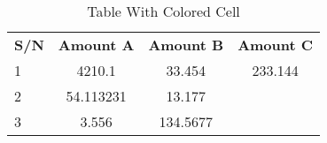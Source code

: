 \documentclass{article}
\begin{document}
	\begin{table}[h!]
		\begin{center}
			\caption{Table With Colored Cell}
			\label{tab:table1}
			\begin{tabular}{l|c|c|c}
				\hline
				\textbf{S/N} & \textbf{Amount A} & \textbf{Amount B} & \textbf{Amount C}\\
				\cellcolor{red!10}1 & 4210.1 & 33.454 & 233.144\\
				\cellcolor{green!90}2 & 54.113231 & 13.177\\
				\cellcolor{blue!40}3 & 3.556 & 134.5677\\
			\end{tabular}
		\end{center}
	\end{table}
\end{document}
